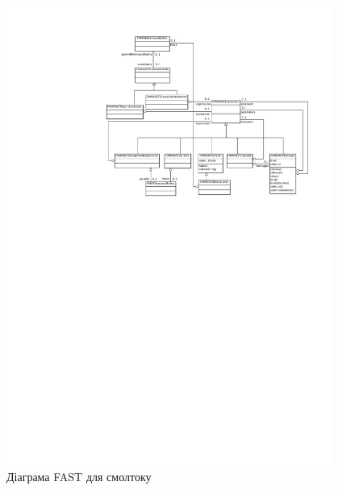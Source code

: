 \documentclass[12pt,a4paper]{article}
\begin{document}
\begin{figure}[h]
  \centering
    \includegraphics[width=0.95\textwidth]{SmalltalkASTClassDiagram}
  \caption{Діаграма FAST для смолтоку\label{smtFast}}
\end{figure}

\clearpage
\end{document}
